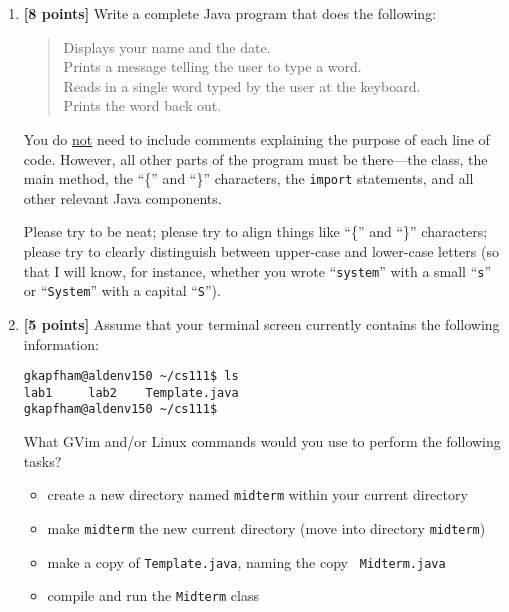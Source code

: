 \documentclass[11pt]{report}
\begin{document}
\begin{enumerate}


\item {\bf [8 points]}
Write a complete Java program that does the following: 
\begin{quote}
Displays your name and the date. \\
Prints a message telling the user to type a word. \\
Reads in a single word typed by the user at the keyboard. \\
Prints the word back out. 
\end{quote}
You do \underline{not} need to include 
comments explaining the purpose of each line of code.
However, all other parts of the program must be
there---the class, the main method, the ``\{'' and ``\}'' characters,
the {\tt import} statements, and all other relevant Java components.

Please try to be neat; please try to align things like ``\{'' and ``\}''
characters; please try to clearly distinguish between upper-case and
lower-case letters (so that I will know, for instance, whether
you wrote ``{\tt system}'' with a small ``{\tt s}'' or ``{\tt System}''
with a capital ``{\tt S}'').

\vspace{1.5in}

\item {\bf [5 points]}
Assume that your terminal screen currently contains the following information:
\begin{center}
\begin{minipage}{3in}
\begin{verbatim}
gkapfham@aldenv150 ~/cs111$ ls
lab1     lab2    Template.java
gkapfham@aldenv150 ~/cs111$ 
\end{verbatim}
\end{minipage}
\end{center}

What GVim and/or Linux commands would you use to perform the following tasks? 
\begin{itemize}
\item create a new directory named {\tt midterm} within your current directory
\item make {\tt midterm} the new current directory (move into directory {\tt midterm})
\item make a copy of {\tt Template.java}, naming the copy {\tt
Midterm.java}
\item compile and run the {\tt Midterm} class
\end{itemize}


\end{enumerate}
\end{document}
